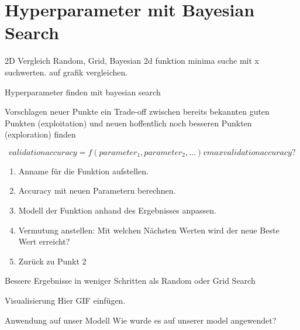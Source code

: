 \section{Hyperparameter mit Bayesian Search}


\begin{frame}{2D Vergleich Random, Grid, Bayesian}
    2d funktion minima suche mit x suchwerten. auf grafik vergleichen.
\end{frame}


\begin{frame}[allowframebreaks]{Hyperparameter finden mit bayesian search}

Vorschlagen neuer Punkte ein Trade-off zwischen bereits bekannten guten Punkten (exploitation) und neuen hoffentlich noch besseren Punkten (exploration) finden

\begin{equation}
    validation accuracy = f (parameter_1, parameter_2, ...)
    vmax validation accuracy ?
\end{equation}

\begin{enumerate}
    \item Anname für die Funktion aufstellen.
    \item Accuracy mit neuen Parametern berechnen.
    \item Modell der Funktion anhand des Ergebnisses anpassen.
    \item Vermutung anstellen: Mit welchen Nächsten Werten wird der neue Beste Wert erreicht?
    \item Zurück zu Punkt 2
\end{enumerate}

Bessere Ergebnisse in weniger Schritten als Random oder Grid Search

    
\end{frame}


\begin{frame}{Visualisierung}
    Hier GIF einfügen.
\end{frame}


\begin{frame}[fragile]{Anwendung auf unser Modell}
Wie wurde es auf unserer model angewendet?
\end{frame}